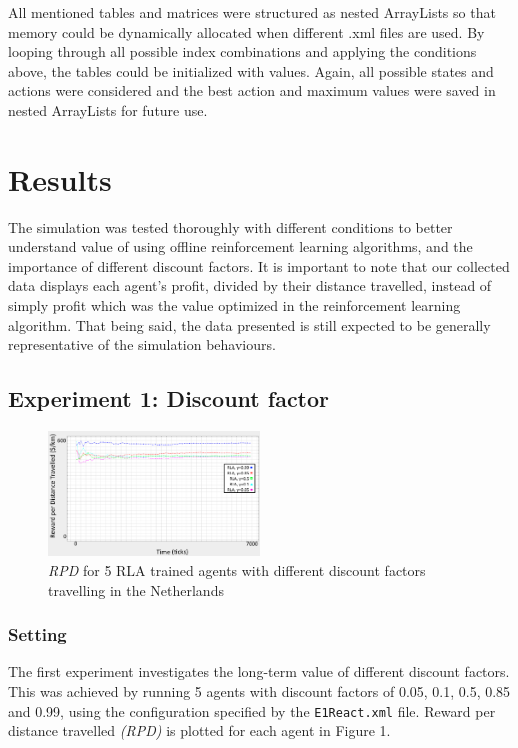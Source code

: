 \documentclass[11pt]{article}
\begin{document}
All mentioned tables and matrices were structured as nested ArrayLists so that memory could be dynamically allocated when different .xml files are used. By looping through all possible index combinations and applying the conditions above, the tables could be initialized with values. Again, all possible states and actions were considered and the best action and maximum values were saved in nested ArrayLists for future use. 

\section{Results}
The simulation was tested thoroughly with different conditions to better understand value of using offline reinforcement learning algorithms, and the importance of different discount factors. It is important to note that our collected data displays each agent's profit, divided by their distance travelled, instead of simply profit which was the value optimized in the reinforcement learning algorithm. That being said, the data presented is still expected to be generally representative of the simulation behaviours. 
\subsection{Experiment 1: Discount factor}
\begin{figure}
	\centering
	\includegraphics[width=0.5\textwidth]{ex1}
	\caption{\textit{RPD} for 5 RLA trained agents with different discount factors travelling in the Netherlands}
	\label{figure:1}
\end{figure}
\subsubsection{Setting}
The first experiment investigates the long-term value of different discount factors. This was achieved by running 5 agents with discount factors of 0.05, 0.1, 0.5, 0.85 and 0.99, using the configuration specified by the \texttt{E1React.xml} file. Reward per distance travelled \textit{(RPD)} is plotted for each agent in Figure 1.
\end{document}
